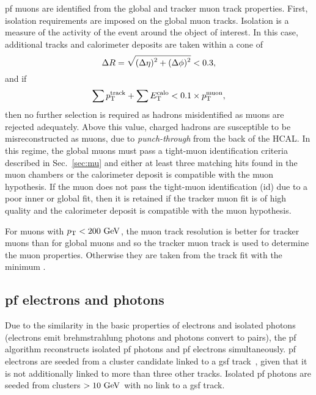 \acrshort{pf} muons are identified from the global and tracker muon track properties.
First, isolation requirements are imposed on the global muon tracks.
Isolation is a measure of the activity of the event around the object of interest.
In this case, additional tracks and calorimeter deposits are taken within a cone of 
\begin{equation}
	\Delta R=\sqrt{\smash[b]{(\Delta\eta)^2+(\Delta\phi)^2}} < 0.3,
\end{equation}
and if 
\begin{equation*}
	\sum p_{\mathrm{T}}^{\text{track}}+\sum E_{\mathrm{T}}^{\text{calo}} < 0.1\times p_{\mathrm{T}}^{\text{muon}},
\end{equation*}
then no further selection is required as hadrons misidentified as muons are rejected adequately.
Above this value, charged hadrons are susceptible to be misreconstructed as muons, due to \textit{punch-through} from the back of the HCAL.
In this regime, the global muons must pass a tight-muon identification criteria described in Sec.~\ref{sec:mu} and either at least three matching hits found in the muon chambers or the calorimeter deposit is compatible with the muon hypothesis.
If the muon does not pass the tight-muon identification (\acrshort{id}) due to a poor inner or global fit, then it is retained if the tracker muon fit is of high quality and the calorimeter deposit is compatible with the muon hypothesis.

For muons with $p_{\mathrm{T}}<200\mathrm{~Ge\hspace{-.08em}V}^{}$, the muon track resolution is better for tracker muons than for global muons and so the tracker muon track is used to determine the muon properties.
Otherwise they are taken from the track fit with the minimum \chisq{}.

\subsection{\acrshort{pf} electrons and photons} %
\label{sub:pf_electrons_and_photons}

Due to the similarity in the basic properties of electrons and isolated photons (electrons emit brehmstrahlung photons and photons convert to \electronp{}\electronm{} pairs), the \acrshort{pf} algorithm reconstructs isolated \acrshort{pf} photons and \acrshort{pf} electrons simultaneously.
\acrshort{pf} electrons are seeded from a cluster candidate linked to a \acrfull{gsf} track~\cite{Event:GSF}, given that it is not additionally linked to more than three other tracks.
Isolated \acrshort{pf} photons are seeded from clusters $>10\mathrm{~Ge\hspace{-.08em}V}^{}$ with no link to a \acrshort{gsf} track.

